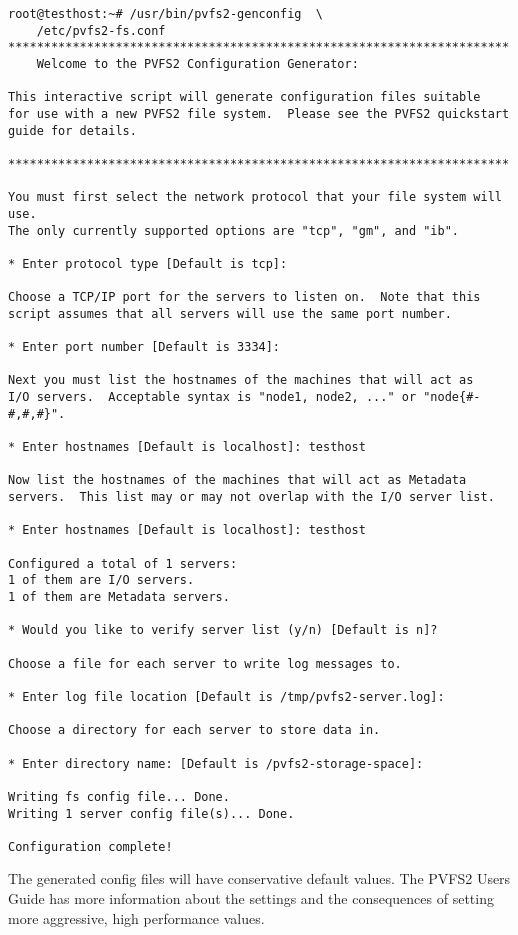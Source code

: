 \documentclass[11pt, letterpaper]{article}
\begin{document}
\begin{verbatim}
root@testhost:~# /usr/bin/pvfs2-genconfig  \
	/etc/pvfs2-fs.conf
**********************************************************************
	Welcome to the PVFS2 Configuration Generator:

This interactive script will generate configuration files suitable
for use with a new PVFS2 file system.  Please see the PVFS2 quickstart
guide for details.

**********************************************************************

You must first select the network protocol that your file system will use.
The only currently supported options are "tcp", "gm", and "ib".

* Enter protocol type [Default is tcp]: 

Choose a TCP/IP port for the servers to listen on.  Note that this
script assumes that all servers will use the same port number.

* Enter port number [Default is 3334]: 

Next you must list the hostnames of the machines that will act as
I/O servers.  Acceptable syntax is "node1, node2, ..." or "node{#-#,#,#}".

* Enter hostnames [Default is localhost]: testhost

Now list the hostnames of the machines that will act as Metadata
servers.  This list may or may not overlap with the I/O server list.

* Enter hostnames [Default is localhost]: testhost

Configured a total of 1 servers:
1 of them are I/O servers.
1 of them are Metadata servers.

* Would you like to verify server list (y/n) [Default is n]? 

Choose a file for each server to write log messages to.

* Enter log file location [Default is /tmp/pvfs2-server.log]: 

Choose a directory for each server to store data in.

* Enter directory name: [Default is /pvfs2-storage-space]: 

Writing fs config file... Done.
Writing 1 server config file(s)... Done.

Configuration complete!
\end{verbatim}

The generated config files will have conservative default values.  The PVFS2
Users Guide has more information about the settings and the consequences of
setting more aggressive, high performance values.
\end{document}
